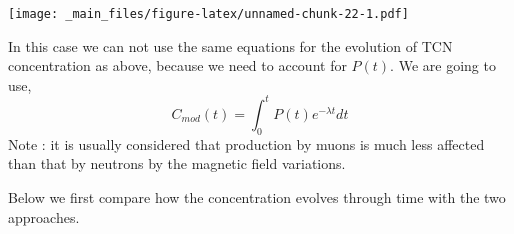 \documentclass[
]{book}
\newenvironment{Shaded}{\begin{snugshade}}{\end{snugshade}}
\newcommand{\AttributeTok}[1]{\textcolor[rgb]{0.77,0.63,0.00}{#1}}
\newcommand{\CommentTok}[1]{\textcolor[rgb]{0.56,0.35,0.01}{\textit{#1}}}
\newcommand{\DecValTok}[1]{\textcolor[rgb]{0.00,0.00,0.81}{#1}}
\newcommand{\FloatTok}[1]{\textcolor[rgb]{0.00,0.00,0.81}{#1}}
\newcommand{\FunctionTok}[1]{\textcolor[rgb]{0.00,0.00,0.00}{#1}}
\newcommand{\NormalTok}[1]{#1}
\newcommand{\OtherTok}[1]{\textcolor[rgb]{0.56,0.35,0.01}{#1}}
\newcommand{\SpecialCharTok}[1]{\textcolor[rgb]{0.00,0.00,0.00}{#1}}
\newcommand{\StringTok}[1]{\textcolor[rgb]{0.31,0.60,0.02}{#1}}
\begin{document}
\begin{Shaded}
\end{Shaded}

\texttt{[image: \_main\_files/figure-latex/unnamed-chunk-22-1.pdf]}

In this case we can not use the same equations for the evolution of TCN concentration as above, because we need to account for \(P(t)\). We are going to use,
\[C_{mod}(t) = \int_0^t P(t)e^{-\lambda t}dt\]
Note : it is usually considered that production by muons is much less affected than that by neutrons by the magnetic field variations.

Below we first compare how the concentration evolves through time with the two approaches.
\end{document}

